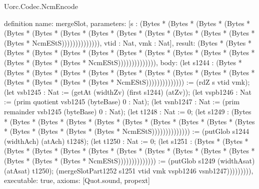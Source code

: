 \begin{lexlean}{Uorc.Codec.NcmEncode}
\begin{semanticmodule}
definition{
  name: mergeSlot,
  parameters: [s : (Bytes * (Bytes * (Bytes * (Bytes * (Bytes * (Bytes * (Bytes * (Bytes * (Bytes * (Bytes * (Bytes * (Bytes * (Bytes * (Bytes * NcmEStS)))))))))))))), vtid : Nat, vmk : Nat],
  result: (Bytes * (Bytes * (Bytes * (Bytes * (Bytes * (Bytes * (Bytes * (Bytes * (Bytes * (Bytes * (Bytes * (Bytes * (Bytes * (Bytes * NcmEStS)))))))))))))),
  body: (let s1244 : (Bytes * (Bytes * (Bytes * (Bytes * (Bytes * (Bytes * (Bytes * (Bytes * (Bytes * (Bytes * (Bytes * (Bytes * (Bytes * (Bytes * NcmEStS)))))))))))))) := (rdZ s vtid vmk); (let vsb1245 : Nat := (getAt (widthZv) (first s1244) (atZv)); (let vspb1246 : Nat := (prim quotient vsb1245 (byteBase) 0 : Nat); (let vsnb1247 : Nat := (prim remainder vsb1245 (byteBase) 0 : Nat); (let t1248 : Nat := 0; (let s1249 : (Bytes * (Bytes * (Bytes * (Bytes * (Bytes * (Bytes * (Bytes * (Bytes * (Bytes * (Bytes * (Bytes * (Bytes * (Bytes * (Bytes * NcmEStS)))))))))))))) := (putGlob s1244 (widthAch) (atAch) t1248); (let t1250 : Nat := 0; (let s1251 : (Bytes * (Bytes * (Bytes * (Bytes * (Bytes * (Bytes * (Bytes * (Bytes * (Bytes * (Bytes * (Bytes * (Bytes * (Bytes * (Bytes * NcmEStS)))))))))))))) := (putGlob s1249 (widthAsat) (atAsat) t1250); (mergeSlotPart1252 s1251 vtid vmk vspb1246 vsnb1247))))))))),
  executable: true,
  axioms: [Quot.sound, propext]
}


\end{semanticmodule}
\end{lexlean}
